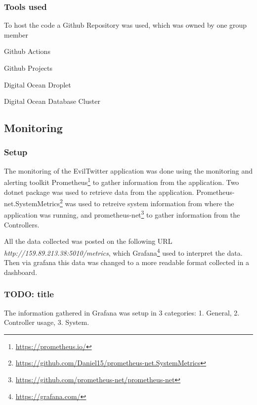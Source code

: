 \documentclass[report/main.tex]{subfiles}
\begin{document}
            \subsubsection{Tools used}

                To host the code a Github Repository was used, which was owned by one group member
        
                Github Actions
                
                Github Projects
                
                Digital Ocean Droplet
                
                Digital Ocean Database Cluster
                
            
        \subsection{Monitoring}
        \label{SubSec:monitoring}
            \subsubsection{Setup}
                The monitoring of the EvilTwitter application was done using the monitoring and alerting toolkit Prometheus\footnote{\hyperlink{https://prometheus.io/}{https://prometheus.io/}} to gather information from the application. Two dotnet package was used to retrieve data from the application. Prometheus-net.SystemMetrics\footnote{\hyperlink{https://github.com/Daniel15/prometheus-net.SystemMetrics}{https://github.com/Daniel15/prometheus-net.SystemMetrics}} was used to retreive system information from where the application was running, and prometheus-net\footnote{\hyperlink{https://github.com/prometheus-net/prometheus-net}{https://github.com/prometheus-net/prometheus-net}} to gather information from the Controllers.
                
                All the data collected was posted on the following URL \textit{http://159.89.213.38:5010/metrics}, which Grafana\footnote{\hyperlink{https://grafana.com/}{https://grafana.com/}} used to interpret the data. Then via grafana this data was changed to a more readable format collected in a dashboard.
            
            \subsubsection{TODO: title}
                The information gathered in Grafana was setup in 3 categories: 1. General, 2. Controller usage, 3. System.
                
\end{document}
